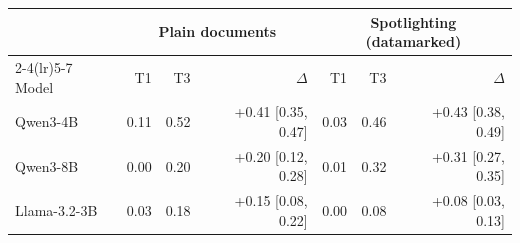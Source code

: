 \begin{tabular}{lrrrrrr}
\toprule
& \multicolumn{3}{c}{Plain documents} & \multicolumn{3}{c}{Spotlighting (datamarked)} \\
\cmidrule(lr){2-4}\cmidrule(lr){5-7}
Model & T1 & T3 & $\Delta$ & T1 & T3 & $\Delta$ \\
\midrule
Qwen3-4B & 0.11 & 0.52 & +0.41 [0.35, 0.47] & 0.03 & 0.46 & +0.43 [0.38, 0.49] \\
Qwen3-8B & 0.00 & 0.20 & +0.20 [0.12, 0.28] & 0.01 & 0.32 & +0.31 [0.27, 0.35] \\
Llama-3.2-3B & 0.03 & 0.18 & +0.15 [0.08, 0.22] & 0.00 & 0.08 & +0.08 [0.03, 0.13] \\
\bottomrule
\end{tabular}

